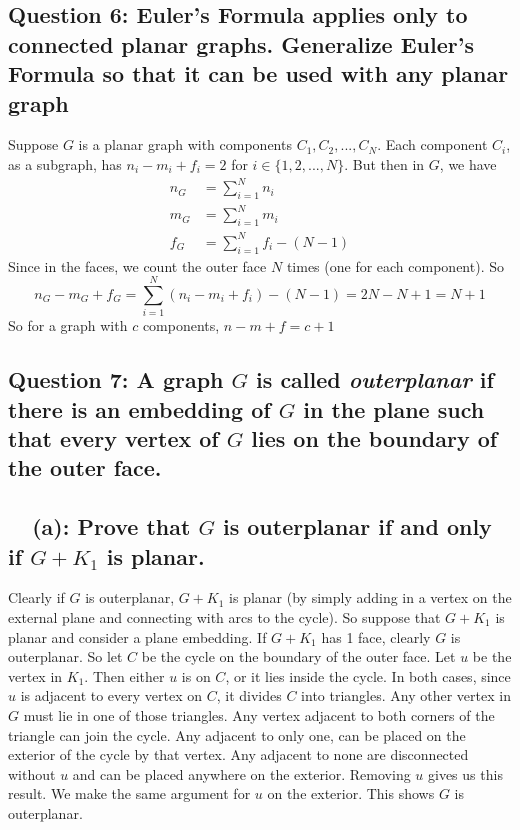 \documentclass[letterpaper, 11pt]{article}
\newcommand{\1}{\mathds{1}}	%
\theoremstyle{definition}
\begin{document}
\subsection*{Question 6: Euler's Formula applies only to connected planar graphs. Generalize Euler's Formula so that it can be used with any planar graph}
Suppose $G$ is a planar graph with components $C_1, C_2, ..., C_N$. Each component $C_i$, as a subgraph, has $n_i - m_i + f_i = 2$ for $i \in \{1,2, ..., N\}$. But then in $G$, we have \begin{align*}
n_G & = \sum \limits _{i=1}^N n_i \\ m_G &=  \sum \limits _{i=1}^N m_i  \\ f_G & = \sum \limits _{i=1}^N f_i  - (N-1)
\end{align*}
Since in the faces, we count the outer face $N$ times (one for each component). So \[
n_G - m_G + f_G = \sum \limits _{i=1}^N (n_i - m_i + f_i) - (N-1) = 2N - N + 1 = N + 1
\]
So for a graph with $c$ components, $n - m + f = c + 1$

\subsection*{Question 7: A graph $G$ is called \textit{outerplanar} if there is an embedding of $G$ in the plane such that
every vertex of $G$ lies on the boundary of the outer face.}
\subsection*{\ \ (a): Prove that $G$ is outerplanar if and only if $G + K_1$ is planar.}
Clearly if $G$ is outerplanar, $G + K_1$ is planar (by simply adding in a vertex on the external plane and connecting with arcs to the cycle). So suppose that $G + K_1$ is planar and consider a plane embedding. If $G + K_1$ has 1 face, clearly $G$ is outerplanar. So let $C$ be the cycle on the boundary of the outer face. Let $u$ be the vertex in $K_1$. Then either $u$ is on $C$, or it lies inside the cycle. In both cases, since $u$ is adjacent to every vertex on $C$, it divides $C$ into triangles. Any other vertex in $G$ must lie in one of those triangles. Any vertex adjacent to both corners of the triangle can join the cycle. Any adjacent to only one, can be placed on the exterior of the cycle by that vertex. Any adjacent to none are disconnected without $u$ and can be placed anywhere on the exterior. Removing $u$ gives us this result. We make the same argument for $u$ on the exterior. This shows $G$ is outerplanar. 
\end{document}
